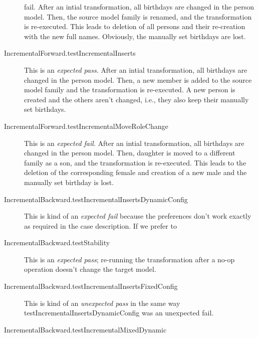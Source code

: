 \documentclass[a4paper]{article}
\begin{document}
\begin{description}
{    fail}.  After an intial transformation, all birthdays are changed in the
  person model.  Then, the source model family is renamed, and the
  transformation is re-executed.  This leads to deletion of all persons and
  their re-creation with the new full names.  Obviously, the manually set
  birthdays are lost.
\item[IncrementalForward.testIncrementalInserts] This is an \emph{expected
    pass}.  After an intial transformation, all birthdays are changed in the
  person model.  Then, a new member is added to the source model family and the
  transformation is re-executed.  A new person is created and the others aren't
  changed, i.e., they also keep their manually set birthdays.
\item[IncrementalForward.testIncrementalMoveRoleChange] This is an
  \emph{expected fail}.  After an intial transformation, all birthdays are
  changed in the person model.  Then, daughter is moved to a different family
  as a son, and the transformation is re-executed.  This leads to the deletion
  of the corresponding female and creation of a new male and the manually set
  birthday is lost.
\item[IncrementalBackward.testIncrementalInsertsDynamicConfig] This is kind of
  an \emph{expected fail} because the preferences don't work exactly as
  required in the case description.  If we prefer to 
\item[IncrementalBackward.testStability] This is an \emph{expected pass};
  re-running the transformation after a no-op operation doesn't change the
  target model.
\item[IncrementalBackward.testIncrementalInsertsFixedConfig] This is kind of an
  \emph{unexpected pass} in the same way testIncrementalInsertsDynamicConfig
  was an unexpected fail.
\item[IncrementalBackward.testIncrementalMixedDynamic] 
\end{description}




\end{document}
